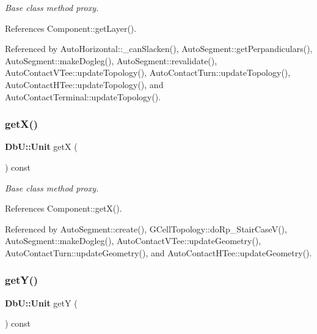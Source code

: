 {\itshape Base class method proxy.} 

References Component\+::get\+Layer().



Referenced by Auto\+Horizontal\+::\+\_\+can\+Slacken(), Auto\+Segment\+::get\+Perpandiculars(), Auto\+Segment\+::make\+Dogleg(), Auto\+Segment\+::revalidate(), Auto\+Contact\+V\+Tee\+::update\+Topology(), Auto\+Contact\+Turn\+::update\+Topology(), Auto\+Contact\+H\+Tee\+::update\+Topology(), and Auto\+Contact\+Terminal\+::update\+Topology().

\mbox{\label{classKatabatic_1_1AutoContact_a00b8f54c8171f6699e57de1b8c18eeb1}} 
\subsubsection{\texorpdfstring{get\+X()}{getX()}}
{\footnotesize\ttfamily \textbf{ Db\+U\+::\+Unit} getX (\begin{DoxyParamCaption}{ }\end{DoxyParamCaption}) const\hspace{0.3cm}{\ttfamily [inline]}}

{\itshape Base class method proxy.} 

References Component\+::get\+X().



Referenced by Auto\+Segment\+::create(), G\+Cell\+Topology\+::do\+Rp\+\_\+\+Stair\+Case\+V(), Auto\+Segment\+::make\+Dogleg(), Auto\+Contact\+V\+Tee\+::update\+Geometry(), Auto\+Contact\+Turn\+::update\+Geometry(), and Auto\+Contact\+H\+Tee\+::update\+Geometry().

\mbox{\label{classKatabatic_1_1AutoContact_a4580de6b074712e400d5d238ce3af054}} 
\subsubsection{\texorpdfstring{get\+Y()}{getY()}}
{\footnotesize\ttfamily \textbf{ Db\+U\+::\+Unit} getY (\begin{DoxyParamCaption}{ }\end{DoxyParamCaption}) const\hspace{0.3cm}{\ttfamily [inline]}}

